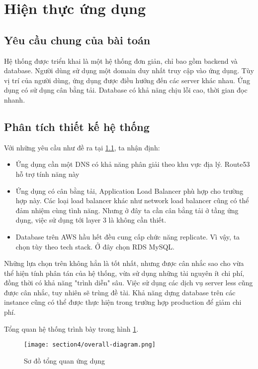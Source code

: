 \section{Hiện thực ứng dụng}
\label{results}

\subsection{Yêu cầu chung của bài toán}
\label{sec4_sub1}
Hệ thống được triển khai là một hệ thống đơn giản, chỉ bao gồm backend và database. Người dùng sử dụng một domain duy nhất truy cập vào ứng dụng. Tùy vị trí của người dùng, ứng dụng được điều hướng đến các server khác nhau. Ứng dụng có sử dụng cân bằng tải. Database có khả năng chịu lỗi cao, thời gian đọc nhanh.

\subsection{Phân tích thiết kế hệ thống}

Với những yêu cầu như đề ra tại \ref{sec4_sub1}, ta nhận định:

\begin{itemize}
    \item Ứng dụng cần một DNS có khả năng phân giải theo khu vực địa lý. Route53 hỗ trợ tính năng này
    \item Ứng dụng có cân bằng tải, Application Load Balancer phù hợp cho trường hợp này. Các loại load balancer khác như network load balancer cũng có thể đảm nhiệm cùng tình năng. Nhưng ở đây ta cần cân bằng tải ở tầng ứng dụng, việc sử dụng tới layer 3 là không cần thiết.
    \item Database trên AWS hầu hết đều cung cấp chức năng replicate. Vì vậy, ta chọn tùy theo tech stack. Ở đây chọn RDS MySQL.
\end{itemize}

Những lựa chọn trên không hẳn là tốt nhất, nhưng được cân nhắc sao cho vừa thể hiện tính phân tán của hệ thống, vừa sử dụng những tài nguyên ít chi phí, đồng thời có khả năng "trình diễn" sâu. Việc sử dụng các dịch vụ server less cũng được cân nhắc, tuy nhiên sẽ trùng đề tài. Khả năng dựng database trên các instance cũng có thể được thực hiện trong trường hợp production để giảm chi phí.

Tổng quan hệ thống trình bày trong hình \ref{fig:sec4-overall-diagram}.

\begin{figure}
    \centering
    \texttt{[image: section4/overall-diagram.png]}
    \caption{Sơ đồ tổng quan ứng dụng}
    \label{fig:sec4-overall-diagram}
\end{figure}


